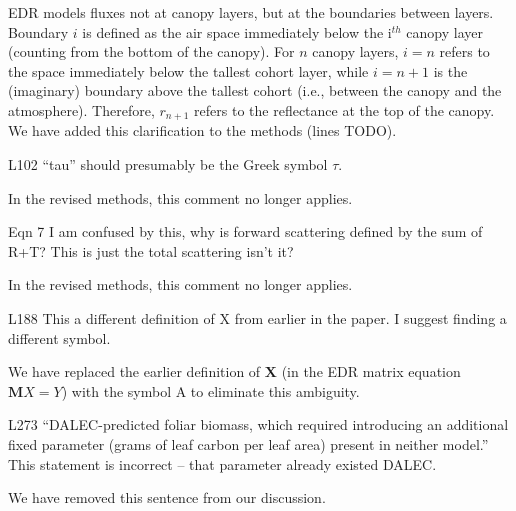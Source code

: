 EDR models fluxes not at canopy layers, but at the boundaries between layers.
Boundary $i$ is defined as the air space immediately below the i$^{th}$ canopy layer (counting from the bottom of the canopy).
For $n$ canopy layers, $i = n$ refers to the space immediately below the tallest cohort layer, while $i = n+1$ is the (imaginary) boundary above the tallest cohort (i.e., between the canopy and the atmosphere).
Therefore, $r_{n+1}$ refers to the reflectance at the top of the canopy.
We have added this clarification to the methods (lines TODO).

\begin{reviewer}
L102 “tau” should presumably be the Greek symbol $\tau$.
\end{reviewer}

In the revised methods, this comment no longer applies.

\begin{reviewer}
Eqn 7 I am confused by this, why is forward scattering defined by the sum of R+T? This is just the total scattering isn’t it?
\end{reviewer}

In the revised methods, this comment no longer applies.

\begin{reviewer}
L188 This a different definition of X from earlier in the paper. I suggest finding a different symbol.
\end{reviewer}

We have replaced the earlier definition of $\mathbf{X}$ (in the EDR matrix equation $\mathbf{M}{X} = {Y}$) with the symbol A to eliminate this ambiguity.

\begin{reviewer}
L273 “DALEC-predicted foliar biomass, which required introducing an additional fixed parameter (grams of leaf carbon per leaf area) present in neither model.” This statement is incorrect – that parameter already existed DALEC.
\end{reviewer}

We have removed this sentence from our discussion.
